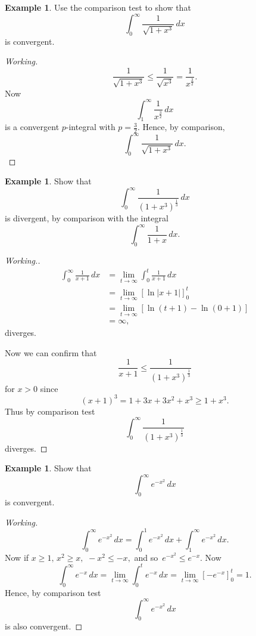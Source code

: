 \documentclass[12pt,a4paper]{report}
\theoremstyle{definition}
\newtheorem{exa}[thm]{Example}
\theoremstyle{plain}
\begin{document}
\begin{exa}
Use the comparison test to show that $$\int_0^{\infty} \frac{1}{\sqrt{1 + x^3}}\, dx$$ is convergent.
\end{exa}

\begin{proof}[Working]
$$\frac{1}{\sqrt{1 + x^3}} \leq \frac{1}{\sqrt{x^3}} = \frac{1}{x^{\frac{3}{2}}}.$$ Now $$\int_1^{\infty} \frac{1}{x^{\frac{3}{2}}}\, dx$$ is a convergent $p$-integral with $p = \frac{3}{2}.$ Hence, by comparison, $$\int_0^{\infty} \frac{1}{\sqrt{1 + x^3}}\, dx.$$
\end{proof}

\begin{exa}
Show that $$\int_0^{\infty} \frac{1}{(1 + x^3)^{\frac{1}{3}}}\, dx$$ is divergent, by comparison with the integral $$\int_0^{\infty} \frac{1}{1 + x}\, dx.$$
\end{exa}



\begin{proof}[Working.]
\begin{align*}
\int_0^{\infty}\frac{1}{x + 1}\, dx & = \lim_{t\rightarrow \infty}\int_0^t\frac{1}{x + 1}\, dx\\
                                    & = \lim_{t\rightarrow \infty} \left[\ln|x + 1|\right]_0^t\\
                                    & = \lim_{t\rightarrow \infty} \left[\ln(t + 1) - \ln(0 + 1)\right]\\
                                    & = \infty, 
\end{align*}
diverges.

Now we can confirm that $$\frac{1}{x + 1} \leq \frac{1}{\left(1 + x^3\right)^{\frac{1}{3}}}$$ for $x>0$ since
$$(x + 1)^3  = 1 + 3x + 3x^2 + x^3 \geq 1 + x^3.$$ Thus by comparison test $$\int_0^{\infty} \frac{1}{(1 + x^3)^{\frac{1}{3}}}$$ diverges.
\end{proof}



\begin{exa}
Show that $$\int_0^{\infty} e^{-x^2} \, dx$$ is convergent.
\end{exa}


\begin{proof}[Working]
$$\int_0^{\infty} e^{-x^2}\, dx = \int_0^1e^{-x^2}\, dx + \int_1^{\infty}e^{-x^2}\, dx.$$
Now if $x \geq 1, \, x^2 \geq x, \, \, -x^2 \leq -x,$ and so $\, e^{-x^2} \leq e^{-x}$. Now
$$\int^{\infty}_0e^{-x} \, dx = \lim_{t\rightarrow \infty} \int_0^te^{-x}\, dx = \lim_{t \rightarrow \infty}\left[-e^{-x}\right]_0^t = 1.$$
Hence, by comparison test $$\int_0^{\infty} e^{-x^2}\, dx $$ is also convergent.
\end{proof}
\end{document}

